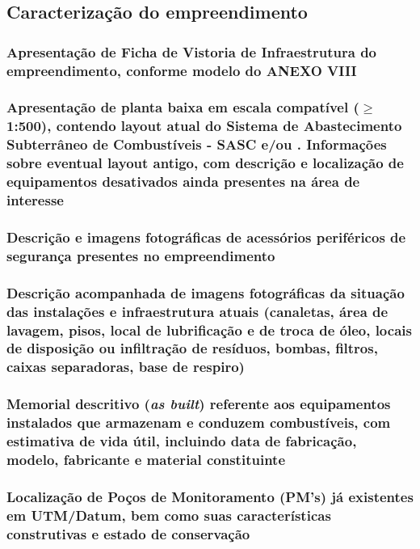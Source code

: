 
\subsection{Caracterização do empreendimento}

\subsubsection{Apresentação de Ficha de Vistoria de Infraestrutura do 
empreendimento, conforme modelo do ANEXO VIII}

\subsubsection{Apresentação de planta baixa em escala compatível 
($\geq$1:500), contendo layout atual do Sistema de 
Abastecimento 
Subterrâneo de Combustíveis - SASC e/ou . Informações sobre 
eventual layout antigo, com descrição e localização de 
equipamentos desativados ainda presentes na área de 
interesse}

\subsubsection{Descrição e imagens fotográficas de acessórios 
periféricos de segurança presentes no empreendimento}

\subsubsection{Descrição acompanhada de imagens fotográficas da situação 
das instalações e infraestrutura atuais (canaletas, área de 
lavagem, pisos, local de lubrificação e de troca de óleo, 
locais de disposição ou infiltração de resíduos, bombas, 
filtros, caixas separadoras, base de respiro)}

\subsubsection{Memorial descritivo (\textit{as built}) referente aos equipamentos 
instalados que armazenam e conduzem combustíveis, com 
estimativa de vida útil, incluindo data de fabricação, 
modelo, fabricante e material constituinte}

\subsubsection{Localização de Poços de Monitoramento (PM's) já 
existentes em UTM/Datum, bem como suas características 
construtivas e estado de conservação}

